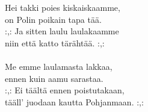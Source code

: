 
Hei takki poies kiskaiskaamme, \\ on Polin poikain tapa tää. \\ :,: Ja sitten laulu laulakaamme \\ niin että katto tärähtää. :,: \\ \hspace{10mm} \\ Me emme laulamasta lakkaa, \\ ennen kuin aamu sarastaa. \\ :,: Ei täältä ennen poistutakaan, \\ tääll' juodaan kautta Pohjanmaan. :,: